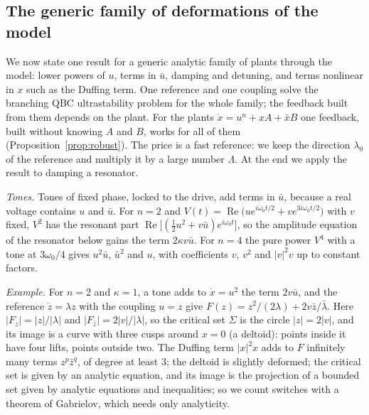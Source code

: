 \documentclass[11pt,reqno]{amsart}
\theoremstyle{plain}
\theoremstyle{definition}
\theoremstyle{remark}
\newcommand{\Sig}{\Sigma}
\begin{document}
\subsection{The generic family of deformations of the model}\label{sec:three}
We now state one result for a generic analytic family of plants through the model: lower powers of $u$, terms in $\bar u$, damping and detuning, and terms nonlinear in $x$ such as the Duffing term. One reference and one coupling solve the branching QBC ultrastability problem for the whole family; the feedback built from them depends on the plant. For the plants $\dot x=u^{n}+xA+\bar xB$ one feedback, built without knowing $A$ and $B$, works for all of them (Proposition~\ref{prop:robust}). The price is a fast reference: we keep the direction $\lambda_0$ of the reference and multiply it by a large number $\Lambda$. At the end we apply the result to damping a resonator.

\emph{Tones.} Tones of fixed phase, locked to the drive, add terms in $\bar u$, because a real voltage contains $u$ and $\bar u$. For $n=2$ and $V(t)=\operatorname{Re}\bigl(ue^{i\omega_0t/2}+ve^{3i\omega_0t/2}\bigr)$ with $v$ fixed, $V^{2}$ has the resonant part $\operatorname{Re}\bigl[(\tfrac12u^{2}+v\bar u)e^{i\omega_0t}\bigr]$, so the amplitude equation of the resonator below gains the term $2\kappa v\bar u$. For $n=4$ the pure power $V^{4}$ with a tone at $3\omega_0/4$ gives $u^{2}\bar u$, $\bar u^{2}$ and $u$, with coefficients $v$, $v^{2}$ and $|v|^{2}v$ up to constant factors.

\emph{Example.} For $n=2$ and $\kappa=1$, a tone adds to $\dot x=u^{2}$ the term $2v\bar u$, and the reference $\dot z=\lambda z$ with the coupling $u=z$ give $F(z)=z^{2}/(2\lambda)+2v\bar z/\bar\lambda$. Here $|F_z|=|z|/|\lambda|$ and $|F_{\bar z}|=2|v|/|\lambda|$, so the critical set $\Sig$ is the circle $|z|=2|v|$, and its image is a curve with three cusps around $x=0$ (a deltoid): points inside it have four lifts, points outside two. The Duffing term $|x|^{2}x$ adds to $F$ infinitely many terms $z^{p}\bar z^{q}$, of degree at least $3$; the deltoid is slightly deformed; the critical set is given by an analytic equation, and its image is the projection of a bounded set given by analytic equations and inequalities; so we count switches with a theorem of Gabrielov, which needs only analyticity.
\end{document}
